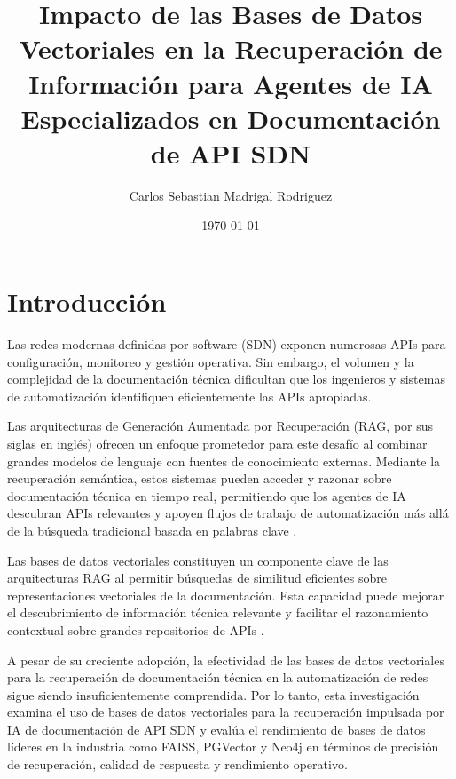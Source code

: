 \documentclass[11pt, a4paper]{article}
\begin{document}
\author{Carlos Sebastian Madrigal Rodriguez}
\title{
    \textbf{Impacto de las Bases de Datos Vectoriales en la Recuperación de Información para Agentes de IA Especializados en Documentación de API SDN}
}
\date{\today}

\maketitle


\section{Introducción}
\label{sec:introduction} 

Las redes modernas definidas por software (SDN) exponen numerosas APIs para configuración, monitoreo y gestión operativa. Sin embargo, el volumen y la complejidad de la documentación técnica dificultan que los ingenieros y sistemas de automatización identifiquen eficientemente las APIs apropiadas.

Las arquitecturas de Generación Aumentada por Recuperación (RAG, por sus siglas en inglés) ofrecen un enfoque prometedor para este desafío al combinar grandes modelos de lenguaje con fuentes de conocimiento externas. Mediante la recuperación semántica, estos sistemas pueden acceder y razonar sobre documentación técnica en tiempo real, permitiendo que los agentes de IA descubran APIs relevantes y apoyen flujos de trabajo de automatización más allá de la búsqueda tradicional basada en palabras clave \parencite{lewis2020rag,wu2024ragsurvey}.

Las bases de datos vectoriales constituyen un componente clave de las arquitecturas RAG al permitir búsquedas de similitud eficientes sobre representaciones vectoriales de la documentación. Esta capacidad puede mejorar el descubrimiento de información técnica relevante y facilitar el razonamiento contextual sobre grandes repositorios de APIs \parencite{johnson2019faiss}.

A pesar de su creciente adopción, la efectividad de las bases de datos vectoriales para la recuperación de documentación técnica en la automatización de redes sigue siendo insuficientemente comprendida. Por lo tanto, esta investigación examina el uso de bases de datos vectoriales para la recuperación impulsada por IA de documentación de API SDN y evalúa el rendimiento de bases de datos líderes en la industria como FAISS, PGVector y Neo4j en términos de precisión de recuperación, calidad de respuesta y rendimiento operativo.
\end{document}
